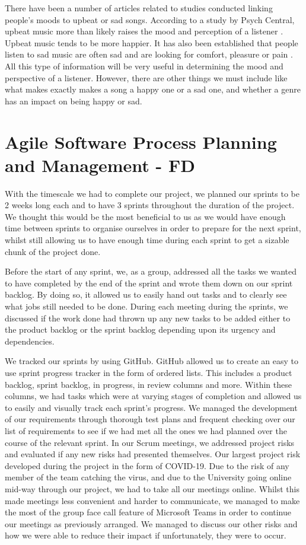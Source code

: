 \documentclass[11pt]{report}
\begin{document}
There have been a number of articles related to studies conducted linking people’s moods to upbeat or sad songs. According to a study by Psych Central, upbeat music more than likely raises the mood and perception of a listener \cite{Nauert2018}. Upbeat music tends to be more happier. It has also been established that people listen to sad music are often sad and are looking for comfort, pleasure or pain \cite{Eerola2016}. All this type of information will be very useful in determining the mood and perspective of a listener. However, there are other things we must include like what makes exactly makes a song a happy one or a sad one, and whether a genre has an impact on being happy or sad.


\chapter{Agile Software Process Planning and Management - FD}

With the timescale we had to complete our project, we planned our sprints to be 2 weeks long each and to have 3 sprints throughout the duration of the project. We thought this would be the most beneficial to us as we would have enough time between sprints to organise ourselves in order to prepare for the next sprint, whilst still allowing us to have enough time during each sprint to get a sizable chunk of the project done.

Before the start of any sprint, we, as a group, addressed all the tasks we wanted to have completed by the end of the sprint and wrote them down on our sprint backlog. By doing so, it allowed us to easily hand out tasks and to clearly see what jobs still needed to be done. During each meeting during the sprints, we discussed if the work done had thrown up any new tasks to be added either to the product backlog or the sprint backlog depending upon its urgency and dependencies.

We tracked our sprints by using GitHub. GitHub allowed us to create an easy to use sprint progress tracker in the form of ordered lists. This includes a product backlog, sprint backlog, in progress, in review columns and more. Within these columns, we had tasks which were at varying stages of completion and allowed us to easily and visually track each sprint’s progress.
We managed the development of our requirements through thorough test plans and frequent checking over our list of requirements to see if we had met all the ones we had planned over the course of the relevant sprint.  In our Scrum meetings, we addressed project risks and evaluated if any new risks had presented themselves. Our largest project risk developed during the project in the form of COVID-19. Due to the risk of any member of the team catching the virus, and due to the University going online mid-way through our project, we had to take all our meetings online. Whilst this made meetings less convenient and harder to communicate, we managed to make the most of the group face call feature of Microsoft Teams in order to continue our meetings as previously arranged. We managed to discuss our other risks and how we were able to reduce their impact if unfortunately, they were to occur.
\end{document}
